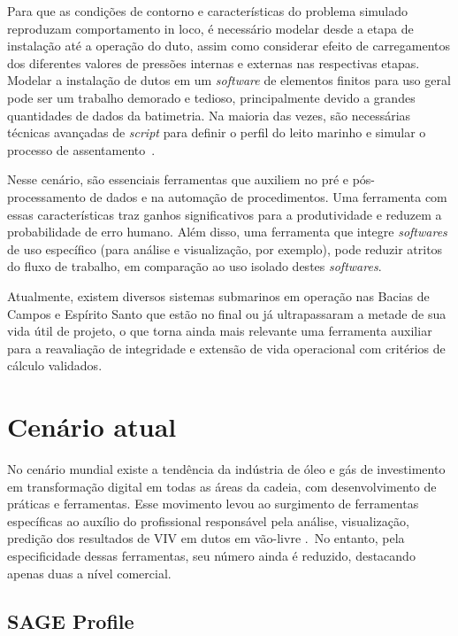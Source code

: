 Para que as condições de contorno e características do problema simulado reproduzam comportamento in loco, é necessário modelar desde a etapa de instalação até a operação do duto, assim como considerar efeito de carregamentos dos diferentes valores de pressões internas e externas nas respectivas etapas.
Modelar a instalação de dutos em um \textit{software} de elementos finitos para uso geral pode ser um trabalho demorado e tedioso, principalmente devido a grandes quantidades de dados da batimetria.
Na maioria das vezes, são necessárias técnicas avançadas de \textit{script} para definir o perfil do leito marinho e simular o processo de assentamento~\cite{VandenAbeele2013}.

Nesse cenário, são essenciais ferramentas que auxiliem no pré e pós-processamento de dados e na automação de procedimentos.
Uma ferramenta com essas características traz ganhos significativos para a produtividade e reduzem a probabilidade de erro humano.
Além disso, uma ferramenta que integre \textit{softwares} de uso específico (para análise e visualização, por exemplo), pode reduzir atritos do fluxo de trabalho, em comparação ao uso isolado destes \textit{softwares}.

Atualmente, existem diversos sistemas submarinos em operação nas Bacias de Campos e Espírito Santo que estão no final ou já ultrapassaram a metade de sua vida útil de projeto, o que torna ainda mais relevante uma ferramenta auxiliar para a reavaliação de integridade e extensão de vida operacional com critérios de cálculo validados.


\section{Cenário atual}


No cenário mundial existe a tendência da indústria de óleo e gás de investimento em transformação digital em todas as áreas da cadeia, com desenvolvimento de práticas e ferramentas. Esse movimento levou ao surgimento de ferramentas específicas ao auxílio do profissional responsável pela análise, visualização, predição dos resultados de VIV em dutos em vão-livre \cite{Mittal2017}.~No entanto, pela especificidade dessas ferramentas, seu número ainda é reduzido, destacando apenas duas a nível comercial.


\subsection{SAGE Profile}



